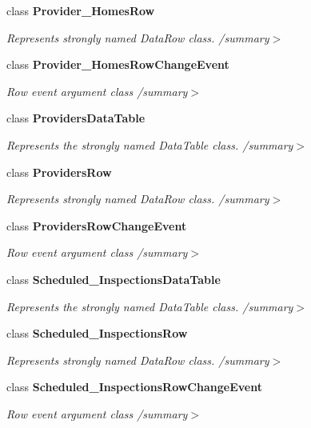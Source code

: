 \begin{DoxyCompactItemize}
class \textbf{ Provider\+\_\+\+Homes\+Row}
\begin{DoxyCompactList}\small\item\em Represents strongly named Data\+Row class. /summary$>$ \end{DoxyCompactList}\item 
class \textbf{ Provider\+\_\+\+Homes\+Row\+Change\+Event}
\begin{DoxyCompactList}\small\item\em Row event argument class /summary$>$ \end{DoxyCompactList}\item 
class \textbf{ Providers\+Data\+Table}
\begin{DoxyCompactList}\small\item\em Represents the strongly named Data\+Table class. /summary$>$ \end{DoxyCompactList}\item 
class \textbf{ Providers\+Row}
\begin{DoxyCompactList}\small\item\em Represents strongly named Data\+Row class. /summary$>$ \end{DoxyCompactList}\item 
class \textbf{ Providers\+Row\+Change\+Event}
\begin{DoxyCompactList}\small\item\em Row event argument class /summary$>$ \end{DoxyCompactList}\item 
class \textbf{ Scheduled\+\_\+\+Inspections\+Data\+Table}
\begin{DoxyCompactList}\small\item\em Represents the strongly named Data\+Table class. /summary$>$ \end{DoxyCompactList}\item 
class \textbf{ Scheduled\+\_\+\+Inspections\+Row}
\begin{DoxyCompactList}\small\item\em Represents strongly named Data\+Row class. /summary$>$ \end{DoxyCompactList}\item 
class \textbf{ Scheduled\+\_\+\+Inspections\+Row\+Change\+Event}
\begin{DoxyCompactList}\small\item\em Row event argument class /summary$>$ \end{DoxyCompactList}\end{DoxyCompactItemize}
